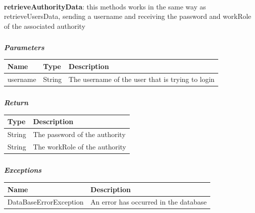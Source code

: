 					\paragraph{}
							\textbf{retrieveAuthorityData}: this methods works in the same way as \newline retrieveUsersData, sending a username and receiving the password and workRole of the associated authority
							\subparagraph{}
							\vspace{-3mm}
							\textit{\textbf{Parameters}}
							\vspace{-2mm}
								\begin{table}[!h]
									\begin{tabular}{L{0.15\textwidth}L{0.15\textwidth}L{0.5\textwidth}}
										\toprule
										\textbf{Name} & \textbf{Type} & \textbf{Description} \\
										\midrule
								  		username & String & The username of the user that is trying to login \\
								 		\bottomrule
									\end{tabular}
								\end{table}
							\subparagraph{}
							\vspace{-6mm}
								\textit{\textbf{Return}}
								\vspace{-2mm}
									\begin{table}[!h]
									\begin{tabular}{ll}
										\toprule
										\textbf{Type} & \textbf{Description} \\
										\midrule
								  		String & The password of the authority \\
								  		String & The workRole of the authority \\
								 		\bottomrule
									\end{tabular}
								\end{table}
							\subparagraph{}
							\vspace{-6mm}
								\textit{\textbf{Exceptions}}
								\vspace{-2mm}
									\begin{table}[!h]
									\begin{tabular}{ll}
										\toprule
										\textbf{Name} & \textbf{Description} \\
										\midrule
								  		DataBaseErrorException & An error has occurred in the database \\ 
								 		\bottomrule
									\end{tabular}
								\end{table}
				\clearpage
